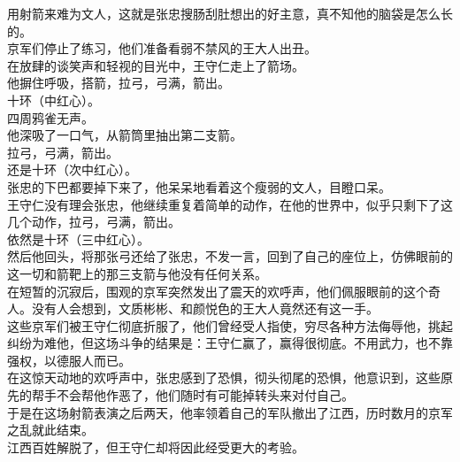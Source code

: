 \begin{multicols}{\theparacolNo}
用射箭来难为文人，这就是张忠搜肠刮肚想出的好主意，真不知他的脑袋是怎么长的。\\

京军们停止了练习，他们准备看弱不禁风的王大人出丑。\\

在放肆的谈笑声和轻视的目光中，王守仁走上了箭场。\\

他摒住呼吸，搭箭，拉弓，弓满，箭出。\\

十环（中红心）。\\

四周鸦雀无声。\\

他深吸了一口气，从箭筒里抽出第二支箭。\\

拉弓，弓满，箭出。\\

还是十环（次中红心）。\\

张忠的下巴都要掉下来了，他呆呆地看着这个瘦弱的文人，目瞪口呆。\\

王守仁没有理会张忠，他继续重复着简单的动作，在他的世界中，似乎只剩下了这几个动作，拉弓，弓满，箭出。\\

依然是十环（三中红心）。\\

然后他回头，将那张弓还给了张忠，不发一言，回到了自己的座位上，仿佛眼前的这一切和箭靶上的那三支箭与他没有任何关系。\\

在短暂的沉寂后，围观的京军突然发出了震天的欢呼声，他们佩服眼前的这个奇人。没有人会想到，文质彬彬、和颜悦色的王大人竟然还有这一手。\\

这些京军们被王守仁彻底折服了，他们曾经受人指使，穷尽各种方法侮辱他，挑起纠纷为难他，但这场斗争的结果是：王守仁赢了，赢得很彻底。不用武力，也不靠强权，以德服人而已。\\

在这惊天动地的欢呼声中，张忠感到了恐惧，彻头彻尾的恐惧，他意识到，这些原先的帮手不会帮他作恶了，他们随时有可能掉转头来对付自己。\\

于是在这场射箭表演之后两天，他率领着自己的军队撤出了江西，历时数月的京军之乱就此结束。\\

江西百姓解脱了，但王守仁却将因此经受更大的考验。\\
\ifnum{}
	\end{multicols}
\fi
\newpage
